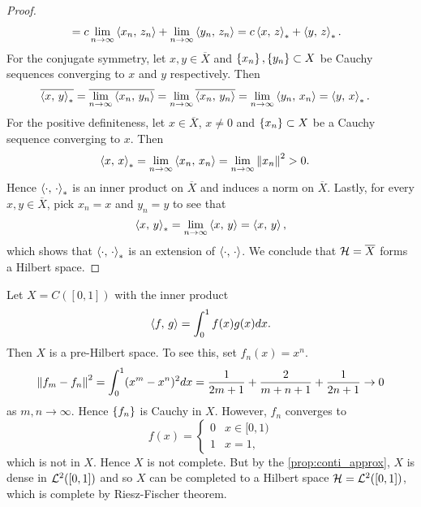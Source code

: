 \begin{proof}
\begin{equation*}
\begin{split}
            &= c\lim_{n\to\infty}\left\langle {x_n},\, {z_n} \right\rangle + \lim_{n\to\infty}\left\langle {y_n},\, {z_n} \right\rangle 
            = c\left\langle {x},\, {z} \right\rangle_* + \left\langle {y},\, {z} \right\rangle_*.
        \end{split}
    \end{equation*}
    For the conjugate symmetry, let $x,y\in\overline{X}$ and $\left\{ {x_n} \right\},
    \left\{ {y_n} \right\}\subset X$ be Cauchy sequences converging to $x$ and $y$ 
    respectively. Then 
    \begin{equation*}
        \begin{split}
            \overline{\left\langle {x},\, {y} \right\rangle_*} &= \overline{\lim_{n\to\infty}\left\langle {x_n},\, {y_n} \right\rangle} 
            = \lim_{n\to\infty}\overline{\left\langle {x_n},\, {y_n} \right\rangle} 
            = \lim_{n\to\infty}\left\langle {y_n},\, {x_n} \right\rangle = \left\langle {y},\, {x} \right\rangle_*.
        \end{split}
    \end{equation*}
    For the positive definiteness, let $x\in\overline{X}$, $x\neq 0$ and 
    $\left\{ {x_n} \right\}\subset X$ be a Cauchy sequence converging to $x$. Then 
    \begin{equation*}
        \begin{split}
            \left\langle {x},\, {x} \right\rangle_* &= \lim_{n\to\infty}\left\langle {x_n},\, {x_n} \right\rangle 
            = \lim_{n\to\infty}\left\lVert {x_n} \right\rVert^2 > 0.
        \end{split}
    \end{equation*}
    Hence $\left\langle {\cdot},\, {\cdot} \right\rangle_*$ is an inner product on $\overline{X}$ and 
    induces a norm on $\overline{X}$. Lastly, for every $x,y\in\overline{X}$, 
    pick $x_n = x$ and $y_n = y$ to see that 
    \begin{equation*}
        \left\langle {x},\, {y} \right\rangle_* = \lim_{n\to\infty}\left\langle {x},\, {y} \right\rangle = \left\langle {x},\, {y} \right\rangle,
    \end{equation*}
    which shows that $\left\langle {\cdot},\, {\cdot} \right\rangle_*$ is an extension of 
    $\left\langle {\cdot},\, {\cdot} \right\rangle$. We conclude that $\mathcal{H} = \overline{X}$ forms a 
    Hilbert space.
\end{proof}

\begin{example}
    Let $X = C([0,1])$ with the inner product 
    \begin{equation*}
        \left\langle {f},\, {g} \right\rangle = \int_0^1 f(x)g(x)dx.
    \end{equation*}
    Then $X$ is a pre-Hilbert space. To see this, set $f_n(x) = x^n$. 
    \begin{equation*}
        \left\lVert {f_m-f_n} \right\rVert^2 = \int_0^1 (x^m - x^n)^2dx 
        = \frac{1}{2m+1} + \frac{2}{m+n+1} + \frac{1}{2n+1}\to 0
    \end{equation*}
    as $m,n\to\infty$. Hence $\left\{ {f_n} \right\}$ is Cauchy in $X$. However, $f_n$ 
    converges to 
    \begin{equation*}
        f(x) = \begin{cases}
            0 & x\in[0,1) \\
            1 & x = 1,
        \end{cases}
    \end{equation*}
    which is not in $X$. Hence $X$ is not complete. But by the 
    \cref{prop:conti_approx}, $X$ is dense in $\mathcal{L}^2([0,1])$ and so $X$ can be 
    completed to a Hilbert space $\mathcal{H} = \mathcal{L}^2([0,1])$, which is complete by 
    Riesz-Fischer theorem.
\end{example}

